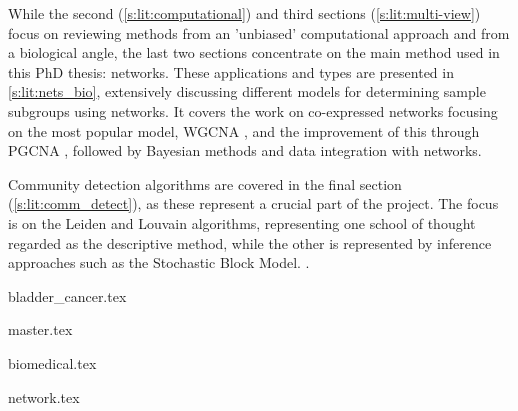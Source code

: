 While the second (\cref{s:lit:computational}) and third sections (\cref{s:lit:multi-view}) focus on reviewing methods from an 'unbiased' computational approach and from a biological angle, the last two sections concentrate on the main method used in this PhD thesis: networks. These applications and types are presented in \cref{s:lit:nets_bio}, extensively discussing different models for determining sample subgroups using networks. It covers the work on co-expressed networks focusing on the most popular model, WGCNA \cite{Langfelder2008-sn}, and the improvement of this through PGCNA \cite{Care2019-ij}, followed by Bayesian methods and data integration with networks.

Community detection algorithms are covered in the final section (\cref{s:lit:comm_detect}), as these represent a crucial part of the project. The focus is on the Leiden and Louvain algorithms, representing one school of thought regarded as the descriptive method, while the other is represented by inference approaches such as the Stochastic Block Model.
.

{bladder_cancer.tex}

\pagebreak

{master.tex}

\newpage

{biomedical.tex}


\pagebreak

{network.tex}



